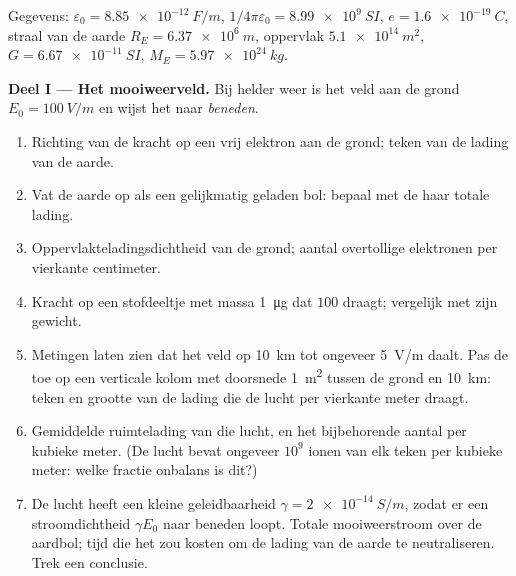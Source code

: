 \begin{problem}
\label{pb:b1:electrostatics-gauss:1}
Gegevens: $\varepsilon_0 = \qty{8.85e-12}{F/m}$, $1/4\pi\varepsilon_0 = \qty{8.99e9}{SI}$,
$e = \qty{1.6e-19}{C}$, straal van de aarde $R_E = \qty{6.37e6}{m}$, oppervlak
$\qty{5.1e14}{m^2}$, $G = \qty{6.67e-11}{SI}$, $M_E = \qty{5.97e24}{kg}$.

\medskip
\noindent\textbf{Deel I --- Het mooiweerveld.}
Bij helder weer is het veld aan de grond $E_0 = \qty{100}{V/m}$ en wijst
het naar \emph{beneden}.
\begin{enumerate}
  \item Richting van de kracht op een vrij elektron aan de grond; teken
        van de lading van de aarde.
  \item Vat de aarde op als een gelijkmatig geladen bol: bepaal met de 
        haar totale lading.
  \item Oppervlakteladingsdichtheid van de grond; aantal overtollige elektronen
        per vierkante centimeter.
  \item Kracht op een stofdeeltje met massa \qty{1}{\micro g} dat $100$
         draagt; vergelijk met zijn gewicht.
  \item Metingen laten zien dat het veld op \qty{10}{km} tot ongeveer \qty{5}{V/m}
        daalt. Pas de  toe op een verticale kolom met
        doorsnede \qty{1}{m^2} tussen de grond en \qty{10}{km}: teken
        en grootte van de lading die de lucht per vierkante meter draagt.
  \item Gemiddelde ruimtelading van die lucht, en het bijbehorende
        aantal  per kubieke meter. (De lucht bevat
        ongeveer $10^9$ ionen van elk teken per kubieke meter: welke fractie
        onbalans is dit?)
  \item De lucht heeft een kleine geleidbaarheid $\gamma = \qty{2e-14}{S/m}$, zodat er
        een stroomdichtheid $\gamma E_0$ naar beneden loopt. Totale mooiweerstroom
        over de aardbol; tijd die het zou kosten om de lading van de
        aarde te neutraliseren. Trek een conclusie.
\end{enumerate}


\end{problem}
